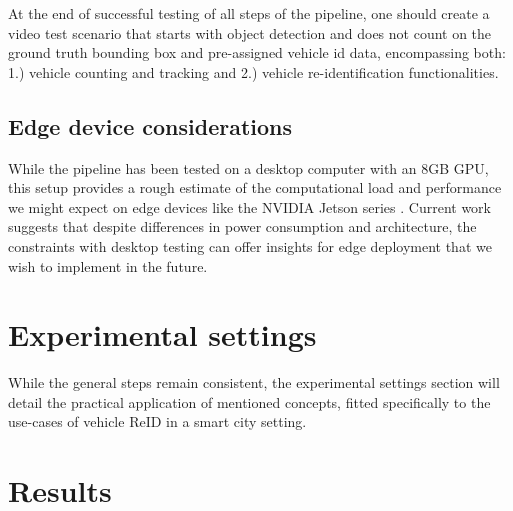 \documentclass[conference]{IEEEtran} %
\begin{document}
	At the end of successful testing of all steps of the pipeline, one should create a video test scenario that starts with object detection and does not count on the ground truth bounding box and pre-assigned vehicle id data, encompassing both: 1.) vehicle counting and tracking and 2.) vehicle re-identification functionalities.
	
	
	
	\subsection{Edge device considerations}
	
	While the pipeline has been tested on a desktop computer with an 8GB GPU, this setup provides a rough estimate of the computational load and performance we might expect on edge devices like the NVIDIA Jetson series \cite{valladares2021performance}. Current work suggests that despite differences in power consumption and architecture, the constraints with desktop testing can offer insights for edge deployment that we wish to implement in the future.
	
	
	
	
	
	 
		
	
	\section{Experimental settings}
	While the general steps remain consistent, the experimental settings section will detail the practical application of mentioned concepts, fitted specifically to the use-cases of vehicle ReID in a smart city setting. 	
	

	\section{Results}
	
\end{document}
